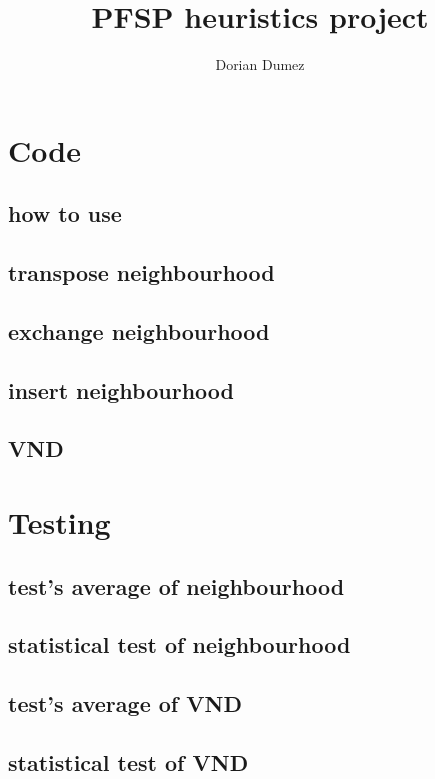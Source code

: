 \documentclass[12pt,a4paper]{article}
\title{PFSP heuristics project}
\author{Dorian Dumez}
\begin{document}
\maketitle

\section{Code}

\subsection{how to use}

\subsection{transpose neighbourhood}

\subsection{exchange neighbourhood}

\subsection{insert neighbourhood}

\subsection{VND}

\section{Testing}

\subsection{test's average of neighbourhood}

\subsection{statistical test of neighbourhood}

\subsection{test's average of VND}

\subsection{statistical test of VND}
\end{document}
